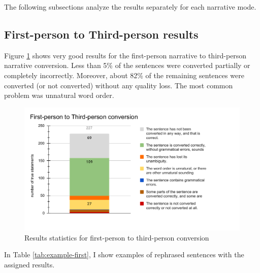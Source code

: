The following subsections analyze the results separately for each narrative mode.

\subsection{First-person to Third-person results}

Figure \ref{fig:eval-first-to-third} shows very good results for the first-person narrative to third-person narrative conversion. Less than 5\% of the sentences were converted partially or completely incorrectly. Moreover, about 82\% of the remaining sentences were converted (or not converted) without any quality loss. The most common problem was unnatural word order.

\begin{figure}[!ht]
\includegraphics[width=\textwidth]{data/Eval-First-To-Third.pdf}
\caption{Results statistics for first-person to third-person conversion}
\label{fig:eval-first-to-third}
\end{figure}

In Table \ref{tab:example-first}, I show examples of rephrased sentences with the assigned results.

